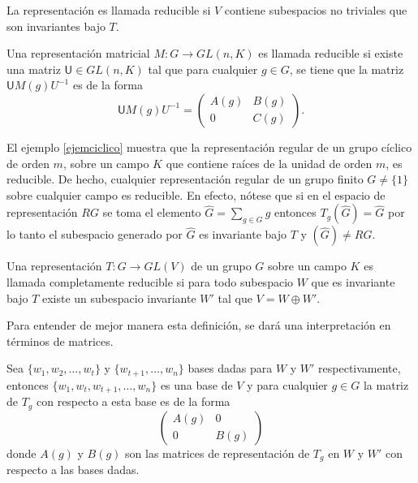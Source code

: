 La representación es llamada reducible si $V$ contiene  subespacios no triviales que son invariantes bajo $T$. 

\begin{definicion}
Una representación matricial $M \colon G \to GL(n,K)$ es llamada reducible si existe una matriz $\mathsf{U} \in GL(n,K)$ tal que para cualquier $g \in G$, se tiene que la matriz $\mathsf{U}M(g)U^{-1}$ es de la forma
\begin{equation*}
\mathsf{U}M(g)U^{-1} = \begin{pmatrix}
A(g) & B(g) \\
0 & C(g)
\end{pmatrix}. 
\end{equation*}  
\end{definicion}

El ejemplo \ref{ejemciclico} muestra que la representación regular de un grupo cíclico de orden $m$, sobre un campo $K$ que contiene raíces de la unidad de orden $m$, es reducible. De hecho, cualquier representación regular de un grupo finito $G \neq \{ 1 \}$ sobre cualquier campo es reducible. En efecto, nótese que si en el espacio de representación $RG$ se toma el elemento $\hat{G} = \sum_{g \in G}g$ entonces $ T_g(\hat{G}) = \hat{G}$ por lo tanto el subespacio generado por $\hat{G}$ es invariante bajo $T$ y $(\hat{G}) \neq RG.$  

\begin{definicion}
Una representación $T \colon G \to GL(V)$ de un grupo $G$ sobre un campo $K$ es llamada completamente reducible si para todo subespacio $W$ que es invariante bajo $T$ existe un subespacio invariante $W'$ tal que $V = W \oplus W'$.
\end{definicion}
Para entender de mejor manera esta definición, se dará una interpretación en términos de matrices.

Sea $\{ w_1, w_2, \dots, w_t \}$ y $\{ w_{t+1}, \dots, w_n\}$ bases dadas para $W$ y $W'$ \mbox{respectivamente}, entonces $\{ w_1, w_t, w_{t+1}, \dots, w_n \}$ es una base de $V$ y para cualquier $g \in G$ la matriz de $T_g$ con respecto a esta base es de la forma
\begin{equation*} \begin{pmatrix}
A(g) & 0 \\
0 & B(g)
\end{pmatrix} \end{equation*} donde $A(g)$ y $B(g)$ son las matrices de representación de $T_g$ en $W$ y $W'$ con respecto a las bases dadas. 

